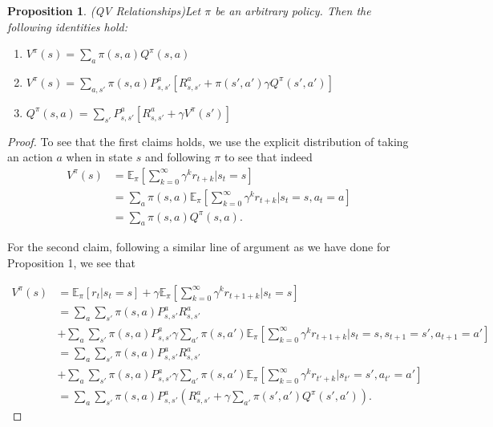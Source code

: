 \documentclass[11pt]{article} %
\newtheorem{prop}{Proposition}
\begin{document}
\begin{prop}{(QV Relationships)}\label{prop_qVRelShips}
	Let $\pi$ be an arbitrary policy. Then the following identities hold:
	\begin{enumerate}
		\item $V^{\pi}(s) = \sum_a \pi(s,a) Q^{\pi}(s,a)$ \\
		\item $V^{\pi}(s) = \sum_{a,s'}  \pi(s,a) P_{s,s'}^a [ R_{s,s'}^a + \pi(s',a') \gamma Q^{\pi}(s',a')] $ \\
		\item $Q^{\pi}(s,a) = \sum_{s'} P_{s,s'}^a [ R_{s,s'}^a + \gamma V^{\pi}(s') ] $
	\end{enumerate}
\end{prop}

\begin{proof}
	To see that the first claims holds, we use the explicit distribution of taking an action $a$ when in state $s$ and following $\pi$ to see that indeed
	\[
		\begin{array}{rl}
			V^{\pi}(s)		& =  \mathbb{E}_{\pi}[\sum_{k=0}^{\infty} \gamma^k r_{t+k} | s_t = s] \\
						& =  \sum_a \pi(s,a) \mathbb{E}_{\pi}[\sum_{k=0}^{\infty} \gamma^k r_{t+k} | s_t = s, a_t = a] \\
						& = \sum_a \pi(s,a) Q^{\pi}(s,a).
		\end{array}
	\]

	For the second claim, following a similar line of argument as we have done for Proposition 1, we see that

	\[
		\begin{array}{rl}
			V^{\pi}(s)		& = \mathbb{E}_{\pi}[r_t | s_t = s] + \gamma \mathbb{E}_{\pi}[\sum_{k=0}^{\infty} \gamma^k r_{t+1+k} | s_t = s] \\
						& = \sum_a \sum_{s'} \pi(s,a) P_{s,s'}^a R_{s,s'}^a \\
						& + \sum_a \sum_{s'} \pi(s,a) P_{s,s'}^a \gamma  \sum_{a'} \pi(s,a') \mathbb{E}_{\pi}[\sum_{k=0}^{\infty} \gamma^k r_{t+1+k} | s_t = s, s_{t+1} = s', a_{t+1} = a'] \\
						& = \sum_a \sum_{s'} \pi(s,a) P_{s,s'}^a R_{s,s'}^a \\
						& + \sum_a \sum_{s'} \pi(s,a) P_{s,s'}^a \gamma  \sum_{a'} \pi(s,a') \mathbb{E}_{\pi}[\sum_{k=0}^{\infty} \gamma^k r_{t'+k} | s_{t'} = s', a_{t'} = a'] \\
						& =  \sum_a \sum_{s'} \pi(s,a) P_{s,s'}^a ( R_{s,s'}^a + \gamma \sum_{a'} \pi(s',a') Q^{\pi}(s',a') ).
		\end{array}
	\]


\end{proof}
\end{document}
